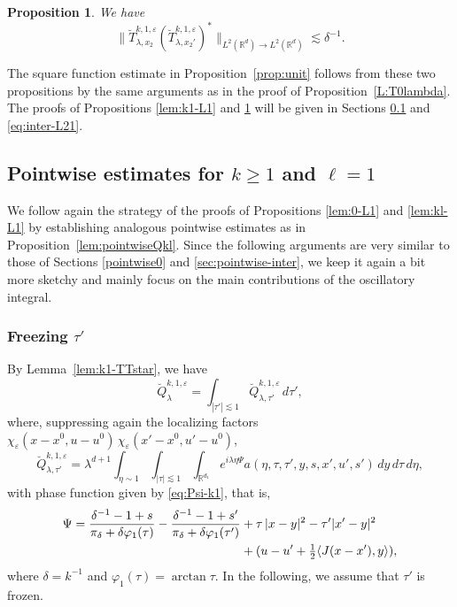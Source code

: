 \documentclass[leqno]{amsart}
\newtheorem{proposition}[theorem]{Proposition}
\theoremstyle{definition}
\theoremstyle{remark}
\numberwithin{equation}{section}
\newcommand{\R}{\mathbb{R}}
\begin{document}
\begin{proposition}\label{lem:k1-L2}
We have
\[
\|\breve T_{\lambda,x_2}^{k,1,\varepsilon} (\breve T_{\lambda,x_2'}^{k,1,\varepsilon} )^*\|_{L^2(\R^{d})\to L^2(\R^{d})} \lesssim \delta^{-1}.
\]
\end{proposition}

The square function estimate in Proposition~\ref{prop:unit}  follows from these two propositions by the same arguments as in the proof of Proposition~\ref{L:T0lambda}. The proofs of  Propositions \ref{lem:k1-L1} and \ref{lem:k1-L2} will be given in Sections \ref{sec:pointwise-inter1} and \ref{eq:inter-L21}. 


\subsection{Pointwise estimates for $k\ge 1$ and $\ell=1$}\label{sec:pointwise-inter1}

We follow again the strategy of the proofs of Propositions \ref{lem:0-L1} and \ref{lem:kl-L1} by establishing analogous pointwise estimates as in Proposition~\ref{lem:pointwiseQkl}. Since the following arguments are very similar to those of Sections \ref{pointwise0} and \ref{sec:pointwise-inter}, we keep it again a bit more sketchy and mainly focus on the main contributions of the oscillatory integral.

\subsubsection{Freezing $\tau'$} 

By Lemma~\ref{lem:k1-TTstar}, we have
\[
\breve Q^{k,1,\varepsilon}_{\lambda}
 =  \int_{|\tau'|\lesssim 1} \breve Q^{k,1,\varepsilon}_{\lambda,\tau'} \, d\tau' ,
\]
where, suppressing again the localizing factors $\chi_\varepsilon(x-x^0,u-u^0)\,\chi_\varepsilon(x'-x^0,u'-u^0)$,
\[
\breve Q^{k,1,\varepsilon}_{\lambda,\tau'}
 = \lambda^{d+1} \int_{\eta\sim 1} \int_{|\tau|\lesssim 1} \int_{\R^{d_1}} e^{i\lambda \eta \Psi} a(\eta,\tau,\tau',y,s,x',u',s')\,dy \, d\tau\, d\eta, 
\]
with phase function given by \eqref{eq:Psi-k1}, that is,
\begin{align}\label{eq:ell1-Psi}
\Psi = \frac{\delta^{-1}-1 + s}{\pi_\delta + \delta \varphi_1(\tau)}
 - \frac{\delta^{-1}-1 + s'}{\pi_\delta + \delta \varphi_1(\tau')} 
 & + \tau\,| x-y|^2 - \tau' | x'-y|^2  \\
 & + ( u - u' + \tfrac 1 2 \langle J(x-x'),y\rangle) , \notag
\end{align}
where $\delta=k^{-1}$ and $\varphi_1(\tau)=\arctan \tau$.
In the following, we assume that $\tau'$ is frozen.
\end{document}
